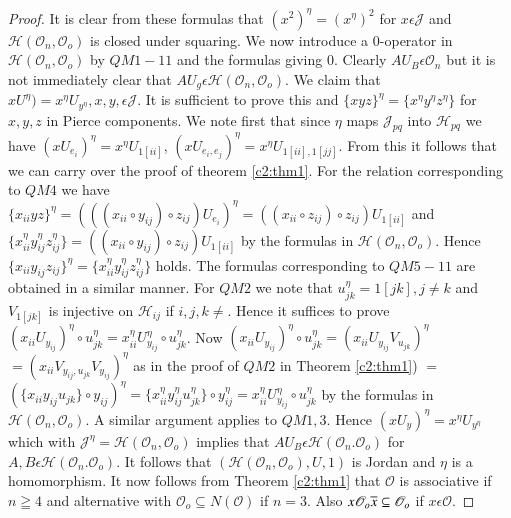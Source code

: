 \begin{proof}
It is clear from these formulas that $(x^{2})^{\eta}=(x^{\eta})^{2}$
for $x\epsilon \mathscr{J}$ and
$\mathscr{H}(\mathscr{O}_n,\mathscr{O}_o)$ is closed under
squaring. We now introduce a $0$-operator in
$\mathscr{H}(\mathscr{O}_n,\mathscr{O}_o)$ by $QM1-11$ and the
formulas giving $0$. Clearly $AU_{B}\epsilon \mathscr{O}_n$ but it is
not immediately clear that $AU_g\epsilon
\mathscr{H}(\mathscr{O}_n,\mathscr{O}_o)$. We claim that
$xU^{\eta})=x^{\eta}U_{y^{\eta}},x,y,\epsilon \mathscr{J}$. It is
sufficient to prove this and\pageoriginale
$\{xyz\}^{\eta}=\{x^{\eta}y^{\eta}z^{\eta}\}$ for $x,y,z$ in Pierce
components. We note first that since $\eta$ maps $\mathscr{J}_{pq}$
into $\mathscr{H}_{pq}$ we have $(xU_{e_i})^{\eta}=x^{\eta}U_{1[ii]}$,
$(x U_{e_i,e_{j}})^{\eta}=x^{\eta}U_{1[ii],1[jj]}$. From this it follows
that we can carry over the proof of theorem \ref{c2:thm1}. For the relation
corresponding to $QM 4$ we have $\{x_{ii}yz\}^{\eta}=(((x_{ii}\circ
y_{ij})\circ z_{ij})U_{e_{i}})^{\eta}=((x_{ii}\circ z_{ij}) \circ
z_{ij}) U_{1[ii]}$
and $\{x^{\eta}_{ii}y^{\eta}_{ij}z^{\eta}_{ij}\}=((x_{ii}\circ
y_{ij})\circ z_{ij})U_{1[ii]}$ by the formulas in
$\mathscr{H}(\mathscr{O}_n,\mathscr{O}_o)$. Hence
$\{x_{ii}y_{ij}z_{ij}\}^{\eta}=\{x^{\eta}_{ii}y^{\eta}_{ij}z^{\eta}_{ij}\}$
holds. The formulas corresponding to $QM 5-11$ are obtained in a
similar manner. For $QM 2$ we note that $u^{\eta}_{jk}=1[jk], j\neq k$
and $V_{1[jk]}$ is injective on $\mathscr{H}_{ij}$ if
$i,j,k\neq$. Hence it suffices to prove
$(x_{ii}U_{y_{ij}})^{\eta}\circ
u^{\eta}_{jk}=x^{\eta}_{ii}U_{y_{ij}}^{\eta}\circ u^{\eta}_{jk}$. Now
$(x_{ii}U_{y_{ij}})^{\eta}\circ
u^{\eta}_{jk}=(x_{ii}U_{y_{ij}}V_{u_{jk}})^{\eta}$
$=(x_{ii}V_{y_{ij},u_{jk}}V_{y_{ij}})^{\eta}$ 
as in the proof of $QM 2$ in Theorem \ref{c2:thm1}) $=$
$(\{x_{ii}y_{ij}u_{jk}\}\circ
y_{ij})^{\eta}=\{x^{\eta}_{ii}y^{\eta}_{ij}u^{\eta}_{jk}\}\circ
y_{ij}^{\eta}=x^{\eta}_{ii}U_{y_{ij}}^{\eta}\circ u^{\eta}_{jk}$ by
the formulas in $\mathscr{H}(\mathscr{O}_n,\mathscr{O}_o)$. A similar
argument applies to $QM 1,3$. Hence $(x
U_y)^{\eta}=x^{\eta}U_{y^{\eta}}$ which with
$\mathscr{J}^{\eta}=\mathscr{H}(\mathscr{O}_n,\mathscr{O}_o)$ implies
that $AU_B\epsilon \mathscr{H}(\mathscr{O}_n.\mathscr{O}_o)$ for
$A,B\epsilon \mathscr{H}(\mathscr{O}_n.\mathscr{O}_o)$. It follows
that $(\mathscr{H}(\mathscr{O}_n, \mathscr{O}_o),U,1)$ is Jordan and
$\eta$ is a homomorphism. It now follows from Theorem \ref{c2:thm1} that
$\mathscr{O}$ is associative if $n\geqq 4$ and alternative with
$\mathscr{O}_o\subseteq N(\mathscr{O})$ if $n=3$. Also
$x\mathscr{O}_o\overline{x}\subseteq \mathscr{O}_o$ if $x\epsilon
\mathscr{O}$.


\end{proof}

